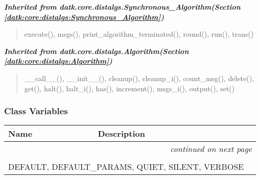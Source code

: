 \large{\textbf{\textit{Inherited from datk.core.distalgs.Synchronous\_Algorithm\textit{(Section \ref{datk:core:distalgs:Synchronous_Algorithm})}}}}

\begin{quote}
execute(), msgs(), print\_algorithm\_terminated(), round(), run(), trans()
\end{quote}

\large{\textbf{\textit{Inherited from datk.core.distalgs.Algorithm\textit{(Section \ref{datk:core:distalgs:Algorithm})}}}}

\begin{quote}
\_\_call\_\_(), \_\_init\_\_(), cleanup(), cleanup\_i(), count\_msg(), delete(), get(), halt(), halt\_i(), has(), increment(), msgs\_i(), output(), set()
\end{quote}


  \subsubsection{Class Variables}

    \vspace{-1cm}
\hspace{\varindent}\begin{longtable}{|p{\varnamewidth}|p{\vardescrwidth}|l}
\cline{1-2}
\cline{1-2} \centering \textbf{Name} & \centering \textbf{Description}& \\
\cline{1-2}
\endhead\cline{1-2}\multicolumn{3}{r}{\small\textit{continued on next page}}\\\endfoot\cline{1-2}
\endlastfoot\multicolumn{2}{|l|}{\textit{Inherited from datk.core.distalgs.Algorithm \textit{(Section \ref{datk:core:distalgs:Algorithm})}}}\\
\multicolumn{2}{|p{\varwidth}|}{\raggedright DEFAULT, DEFAULT\_PARAMS, QUIET, SILENT, VERBOSE}\\
\cline{1-2}
\end{longtable}



